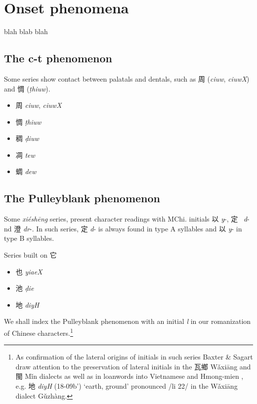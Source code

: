 
\section{Onset phenomena}
blah blab blah 

\subsection{The c-t phenomenon}
Some series show contact between palatals and dentals, such as 周 (\textit{ciuw}, \textit{ciuwX}) and 惆 (\textit{ṭhiuw}).

\begin{itemize}
    \item {\Large{周}} \emph{ciuw}, \emph{ciuwX}
    \item {\Large{惆}} \emph{ṭhiuw}
    \item {\Large{稠}} \emph{ḍiuw}
    \item {\Large{凋}} \emph{tew}
    \item {\Large{蜩}} \emph{dew}
\end{itemize}




\subsection{The Pulleyblank phenomenon}
 Some \emph{xiéshēng}
series, 
present character
readings with MChi.  initials 以  \emph{y}-, 定~ \emph{d}- nd 澄
 \emph{dr}-. In such series, 定  \emph{d}- is always found in type A
syllables and 以 \emph{y}- in type B syllables. 

Series built on {\Large{它}} %
\begin{itemize}\item
{\Large{也}}  \emph{yiaeX} 

\item
{\Large{池}}  \emph{ḍie} 

\item
{\Large{地}}  \emph{diyH} 
\end{itemize}

We shall index the Pulleyblank phenomenon with an initial \textit{l} in our romanization of Chinese characters.\footnote{As confirmation of the lateral origins of initials in such series Baxter
 \& Sagart draw attention to the preservation of lateral initials in the
 瓦鄉 Wǎxiāng and 閩 Mǐn dialects as well as in loanwords into Vietnamese
 and Hmong-mien 
 \citeyearpar[109-110]{Baxter2014OldChinese}, e.g. 地  \emph{diyH} %
 (18-09b') `earth, ground' pronounced /li 22/ in the Wǎxiāng dialect
 Gǔzhàng.}

